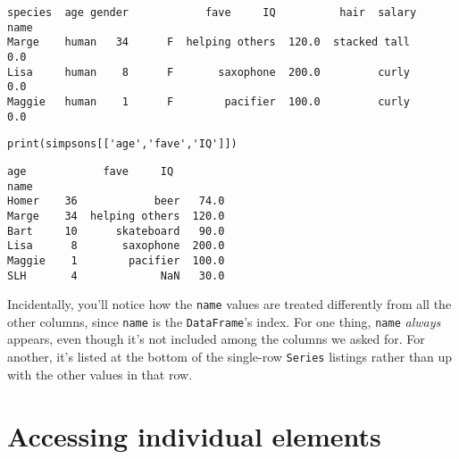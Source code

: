 \begin{Verbatim}[fontsize=\scriptsize,samepage=true,frame=leftline,framesep=5mm,framerule=1mm]
       species  age gender            fave     IQ          hair  salary
name                                                                   
Marge    human   34      F  helping others  120.0  stacked tall     0.0
Lisa     human    8      F       saxophone  200.0         curly     0.0
Maggie   human    1      F        pacifier  100.0         curly     0.0
\end{Verbatim}

\medskip
\begin{Verbatim}[fontsize=\scriptsize,samepage=true,frame=single,framesep=3mm]
print(simpsons[['age','fave','IQ']])
\end{Verbatim}
\vspace{-.2in}

\begin{Verbatim}[fontsize=\scriptsize,samepage=true,frame=leftline,framesep=5mm,framerule=1mm]
        age            fave     IQ
name                              
Homer    36            beer   74.0
Marge    34  helping others  120.0
Bart     10      skateboard   90.0
Lisa      8       saxophone  200.0
Maggie    1        pacifier  100.0
SLH       4             NaN   30.0
\end{Verbatim}

Incidentally, you'll notice how the \texttt{name} values are treated
differently from all the other columns, since \texttt{name} is the
\texttt{DataFrame}'s index. For one thing, \texttt{name} \textit{always}
appears, even though it's not included among the columns we asked for. For
another, it's listed at the bottom of the single-row \texttt{Series} listings
rather than up with the other values in that row.

\section{Accessing individual elements}



